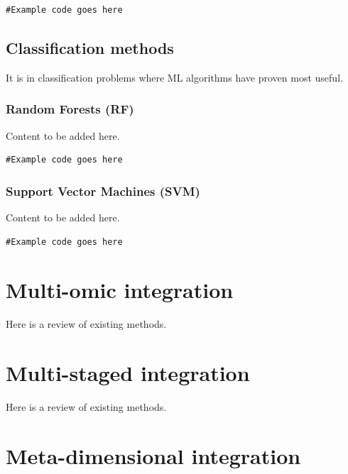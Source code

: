 \documentclass[
]{book}
\begin{document}
\begin{verbatim}
#Example code goes here
\end{verbatim}

\hypertarget{classification-methods}{%
\section{Classification methods}\label{classification-methods}}

It is in classification problems where ML algorithms have proven most useful.

\hypertarget{random-forests}{%
\subsection{Random Forests (RF)}\label{random-forests}}

Content to be added here.

\begin{verbatim}
#Example code goes here
\end{verbatim}

\hypertarget{support-vector-machines}{%
\subsection{Support Vector Machines (SVM)}\label{support-vector-machines}}

Content to be added here.

\begin{verbatim}
#Example code goes here
\end{verbatim}

\hypertarget{multi-omic-integration}{%
\chapter{Multi-omic integration}\label{multi-omic-integration}}

Here is a review of existing methods.

\hypertarget{multi-staged-integration}{%
\chapter{Multi-staged integration}\label{multi-staged-integration}}

Here is a review of existing methods.

\hypertarget{meta-dimensional-integration}{%
\chapter{Meta-dimensional integration}\label{meta-dimensional-integration}}
\end{document}
